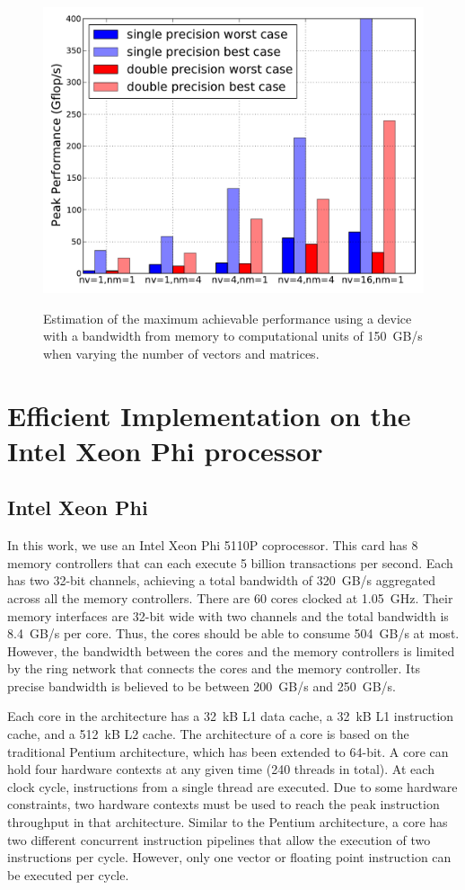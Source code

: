 \documentclass[10pt,conference,compsocconf]{IEEEtran}
\begin{document}
\begin{figure}
  \centering 
  \includegraphics[width=.9\linewidth]{figures/gflops_peak.pdf}\label{fig:gflops-peak-perf}
  \caption{Estimation of the maximum achievable performance using a
    device with a bandwidth from memory to computational units of 150~GB/s when
    varying the number of vectors and matrices.}
  \label{fig:perf_predict}
\end{figure}

\section{Efficient Implementation on the Intel Xeon Phi processor}
\label{sec:impl}

\subsection{Intel Xeon Phi}

In this work, we use an Intel Xeon Phi 5110P coprocessor. This card
has 8 memory controllers that can each execute 5 billion
transactions per second. Each has two 32-bit channels, achieving a total
bandwidth of 320~GB/s aggregated across all the memory
controllers. There are 60 cores clocked at 1.05~GHz. Their memory
interfaces are 32-bit wide with two channels and the total bandwidth
is 8.4~GB/s per core. Thus, the cores should be able to consume 504~GB/s
at most. However, the bandwidth between the cores and the memory
controllers is limited by the ring network that connects the cores and
the memory controller. Its precise bandwidth is
believed to be between 200~GB/s and 250~GB/s.

Each core in the architecture has a 32~kB L1 data cache, a 32~kB L1
instruction cache, and a 512~kB L2 cache. The architecture of a core is
based on the traditional Pentium architecture, which has been extended to
64-bit. A core can hold four hardware contexts at any given time (240 threads in total). At each
clock cycle, instructions from a single thread are executed. Due to
some hardware constraints, two hardware contexts must be used to reach
the peak instruction throughput in that architecture. Similar to the
Pentium architecture, a core has two different concurrent instruction
pipelines that allow the execution of two instructions per
cycle. However, only one vector or floating point instruction can be
executed per cycle.
\end{document}
